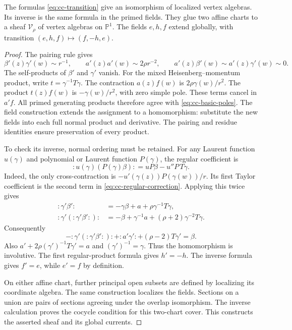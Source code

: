 \begin{theorem}\label{thm:cc-gluing}
The formulas \eqref{eq:cc-transition} give an isomorphism of localized vertex algebras.
Its inverse is the same formula in the primed fields.
They glue two affine charts to a sheaf $\mathcal V_\rho$ of vertex algebras on $\mathbb P^1$.
The fields $e,h,f$ extend globally, with transition $(e,h,f)\mapsto(f,-h,e)$.
\end{theorem}
\begin{proof}
The pairing rule gives
\[
 \beta'(z)\gamma'(w)\sim r^{-1},\qquad
 a'(z)a'(w)\sim2\rho r^{-2},\qquad
 a'(z)\beta'(w)\sim a'(z)\gamma'(w)\sim0.
\]
The self-products of $\beta'$ and $\gamma'$ vanish.
For the mixed Heisenberg--momentum product, write $t=\gamma^{-1}T\gamma$.
The contraction $a(z)f(w)$ is $2\rho\gamma(w)/r^2$.
The product $t(z)f(w)$ is $-\gamma(w)/r^2$, with zero simple pole.
These terms cancel in $a'f$.
All primed generating products therefore agree with \eqref{eq:cc-basic-poles}.
The field construction extends the assignment to a homomorphism: substitute the new fields into each full normal product and derivative.
The pairing and residue identities ensure preservation of every product.

To check its inverse, normal ordering must be retained.
For any Laurent function $u(\gamma)$ and polynomial or Laurent function $P(\gamma)$, the regular coefficient is
\begin{equation}\label{eq:cc-regular-correction}
 :u(\gamma)(P(\gamma)\beta):
 =uP\beta-u''P\,T\gamma.
\end{equation}
Indeed, the only cross-contraction is
$-u'(\gamma(z))P(\gamma(w))/r$.
Its first Taylor coefficient is the second term in \eqref{eq:cc-regular-correction}.
Applying this twice gives
\begin{align*}
 :\gamma'\beta':&=-\gamma\beta+a+\rho\gamma^{-1}T\gamma,\\
 :\gamma'(:\gamma'\beta':):&=
 -\beta+\gamma^{-1}a+(\rho+2)\gamma^{-2}T\gamma.
\end{align*}
Consequently
\[
 -:\gamma'(:\gamma'\beta':):+:a'\gamma':
       +(\rho-2)T\gamma'=\beta.
\]
Also $a'+2\rho(\gamma')^{-1}T\gamma'=a$ and $(\gamma')^{-1}=\gamma$.
Thus the homomorphism is involutive.
The first regular-product formula gives $h'=-h$.
The inverse formula gives $f'=e$, while $e'=f$ by definition.

On either affine chart, further principal open subsets are defined by localizing its coordinate algebra.
The same construction localizes the fields.
Sections on a union are pairs of sections agreeing under the overlap isomorphism.
The inverse calculation proves the cocycle condition for this two-chart cover.
This constructs the asserted sheaf and its global currents.
\end{proof}

